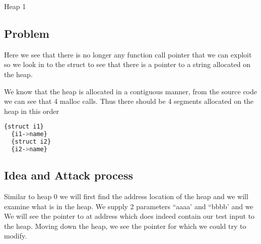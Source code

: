 
\begin{center}\begin{LARGE}Heap 1\end{LARGE}\end{center}
 
\subsection*{Problem}

Here we see that there is no longer any function call pointer that we can exploit
so we look in to the  struct to see that there is a pointer to
a string allocated on the heap.

We know that the heap is allocated in a contiguous manner, from the source
code we can see that 4 malloc calls. Thus there should be 4 segments allocated on
the heap in this order

\begin{lstlisting}[language=bash]
  {struct i1}
  {i1->name}
  {struct i2}
  {i2->name}
\end{lstlisting}


\subsection*{Idea and Attack process}

Similar to heap 0 we will first find the address location of the heap and
we will examine what is in the heap. We supply 2 parameters ``aaaa' and ``bbbb'
and we We will see the pointer to 
at address  which does indeed contain our test input to the heap.
Moving down the heap, we see the pointer for  which we could
try to modify.

